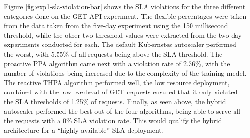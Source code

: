 \begin{center}
\begin{minipage}{\linewidth}
    \label{fig:exp1-sla-violation-bar}
\end{minipage}
\end{center}

Figure \ref{fig:exp1-sla-violation-bar} shows the SLA violations for the three different categories done on the GET API experiment. The flexible percentages were taken from the data taken from the five-day experiment using the 150 millisecond threshold, while the other two threshold values were extracted from the two-day experiments conducted for each. The default Kubernetes autoscaler performed the worst, with 5.55\% of all requests being above the SLA threshold. The proactive PPA algorithm came next with a violation rate of 2.36\%, with the number of violations being increased due to the complexity of the training model. The reactive THPA algorithm performed well, the low resource deployment, combined with the low overhead of GET requests ensured that it only violated the SLA thresholds of 1.25\% of requests. Finally, as seen above, the hybrid autoscaler performed the best out of the four algorithms, being able to serve all the requests with a 0\% SLA violation rate. This would qualify the hybrid architecture for a ``highly available'' SLA deployment.\par

